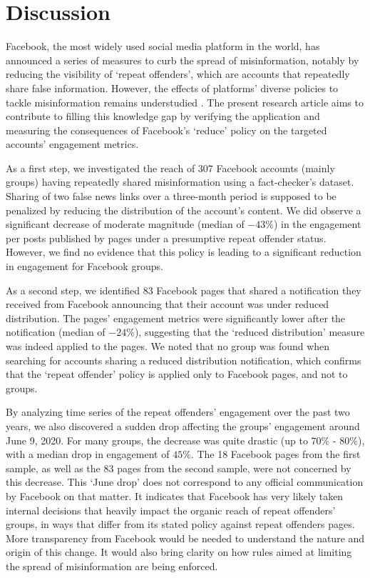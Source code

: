 \documentclass[11pt,a4paper]{article}
\begin{document}
\section{Discussion}

Facebook, the most widely used social media platform in the world, has announced a series of measures to curb the spread of misinformation, notably by reducing the visibility of `repeat offenders', which are accounts that repeatedly share false information. 
However, the effects of platforms' diverse policies to tackle misinformation remains understudied \citep{pasquetto2020tackling}. 
The present research article aims to contribute to filling this knowledge gap by verifying the application and measuring the consequences of Facebook's `reduce' policy on the targeted accounts' engagement metrics.

As a first step, we investigated the reach of 307 Facebook accounts (mainly groups) having repeatedly shared misinformation using a fact-checker's dataset. 
Sharing of two false news links over a three-month period is supposed to be penalized by reducing the distribution of the account's content. 
We did observe a significant decrease of moderate magnitude (median of $-43\%$) in the engagement per posts published by pages under a presumptive repeat offender status.
However, we find no evidence that this policy is leading to a significant reduction in engagement for Facebook groups.
 
As a second step, we identified 83 Facebook pages that shared a notification they received from Facebook announcing that their account was under reduced distribution.
The pages' engagement metrics were significantly lower after the notification (median of $-24\%$), suggesting that the `reduced distribution' measure was indeed applied to the pages.
We noted that no group was found when searching for accounts sharing a reduced distribution notification, which confirms that the `repeat offender' policy is applied only to Facebook pages, and not to groups.

By analyzing time series of the repeat offenders’ engagement over the past two years, we also discovered a sudden drop affecting the groups’ engagement around June 9, 2020.
For many groups, the decrease was quite drastic (up to $70\%$ - $80\%$), with a median drop in engagement of $45\%$.
The 18 Facebook pages from the first sample, as well as the 83 pages from the second sample, were not concerned by this decrease.
This `June drop' does not correspond to any official communication by Facebook on that matter. 
It indicates that Facebook has very likely taken internal decisions that heavily impact the organic reach of repeat offenders' groups, in ways that differ from its stated policy against repeat offenders pages.
More transparency from Facebook would be needed to understand the nature and origin of this change. 
It would also bring clarity on how rules aimed at limiting the spread of misinformation are being enforced.
\end{document}
